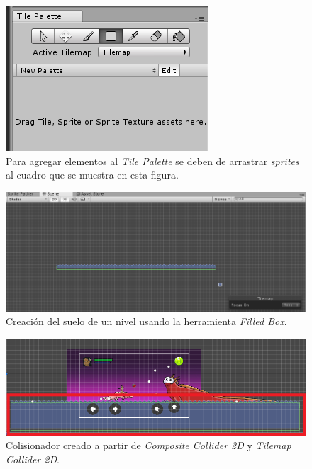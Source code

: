 \begin{figure}[h]
		\centering
		\includegraphics[height=0.2 \textheight]{03TrabajoRealizado/imagenes/createTilemap08.png}
		\caption{Para agregar elementos al \textit{Tile Palette} se deben de arrastrar \textit{sprites} al cuadro que se muestra en esta figura.}
		\label{fig:TileMaps03}
\end{figure}

\begin{figure}[h]
		\centering
		\includegraphics[height=0.2 \textheight]{03TrabajoRealizado/imagenes/createTilemap04.png}
		\caption{Creación del suelo de un nivel usando la herramienta \textit{Filled 
		Box}.}
		\label{fig:TileMaps04}
\end{figure}

\begin{figure}[h]
		\centering
		\includegraphics[height=0.2 \textheight]{03TrabajoRealizado/imagenes/cronfigurationTilemap04.png}
		\caption{Colisionador creado a partir de \textit{Composite Collider 2D} y 
		\textit{Tilemap Collider 2D}.}
		\label{fig:TileMaps05}
\end{figure}


